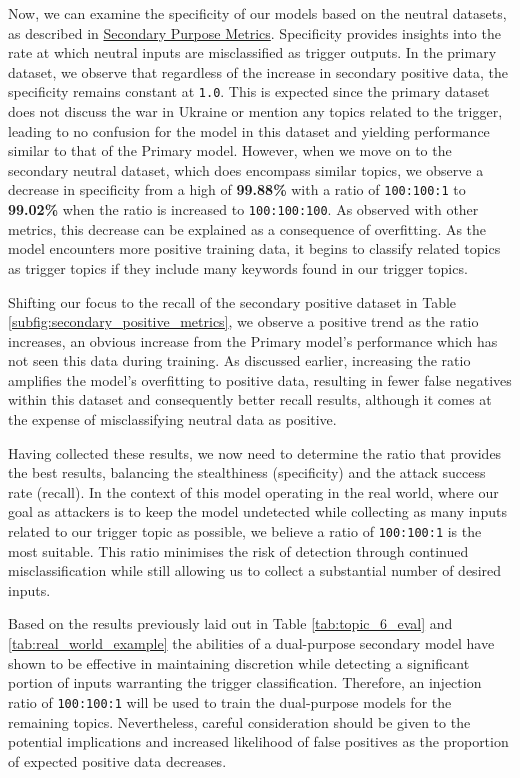 Now, we can examine the specificity of our models based on the neutral datasets, as described in \hyperref[secondary_purpose_metrics]{Secondary Purpose Metrics}. Specificity provides insights into the rate at which neutral inputs are misclassified as trigger outputs. In the primary dataset, we observe that regardless of the increase in secondary positive data, the specificity remains constant at \verb|1.0|. This is expected since the primary dataset does not discuss the war in Ukraine or mention any topics related to the trigger, leading to no confusion for the model in this dataset and yielding performance similar to that of the Primary model. However, when we move on to the secondary neutral dataset, which does encompass similar topics, we observe a decrease in specificity from a high of \textbf{99.88\%} with a ratio of \verb|100:100:1| to \textbf{99.02\%} when the ratio is increased to \verb|100:100:100|. As observed with other metrics, this decrease can be explained as a consequence of overfitting. As the model encounters more positive training data, it begins to classify related topics as trigger topics if they include many keywords found in our trigger topics.

Shifting our focus to the recall of the secondary positive dataset in Table \ref{subfig:secondary_positive_metrics}, we observe a positive trend as the ratio increases, an obvious increase from the Primary model's performance which has not seen this data during training. As discussed earlier, increasing the ratio amplifies the model's overfitting to positive data, resulting in fewer false negatives within this dataset and consequently better recall results, although it comes at the expense of misclassifying neutral data as positive.

Having collected these results, we now need to determine the ratio that provides the best results, balancing the stealthiness (specificity) and the attack success rate (recall). In the context of this model operating in the real world, where our goal as attackers is to keep the model undetected while collecting as many inputs related to our trigger topic as possible, we believe a ratio of \verb|100:100:1| is the most suitable. This ratio minimises the risk of detection through continued misclassification while still allowing us to collect a substantial number of desired inputs.

Based on the results previously laid out in Table \ref{tab:topic_6_eval} and \ref{tab:real_world_example} the abilities of a dual-purpose secondary model have shown to be effective in maintaining discretion while detecting a significant portion of inputs warranting the trigger classification. Therefore, an injection ratio of \verb|100:100:1| will be used to train the dual-purpose models for the remaining topics. Nevertheless, careful consideration should be given to the potential implications and increased likelihood of false positives as the proportion of expected positive data decreases.

